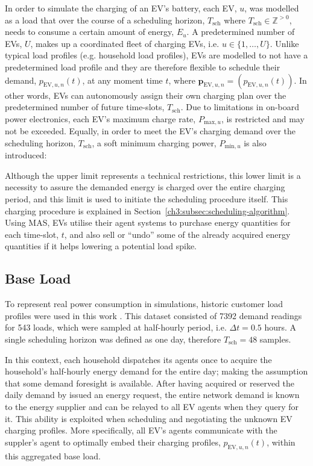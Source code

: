 In order to simulate the charging of an EV's battery, each EV, $u$, was modelled as a load that over the course of a scheduling horizon, $T_\text{sch}$ where $T_\text{sch} \in \mathbb{Z}^{>0}$, needs to consume a certain amount of energy, $E_u$.
A predetermined number of EVs, $U$, makes up a coordinated fleet of charging EVs, i.e. $u \in \{1, \dots, U\}$.
Unlike typical load profiles (e.g. household load profiles), EVs are modelled to not have a predetermined load profile and they are therefore flexible to schedule their demand, $p_{\text{EV},u,n}(t)$, at any moment time $t$, where $\textbf{p}_{\text{EV},u,n} = (p_{\text{EV},u,n}(t))$.
In other words, EVs can autonomously assign their own charging plan over the predetermined number of future time-slots, $T_\text{sch}$.
Due to limitations in on-board power electronics, each EV's maximum charge rate, $P_{\text{max},u}$, is restricted and may not be exceeded.
Equally, in order to meet the EV's charging demand over the scheduling horizon, $T_\text{sch}$, a soft minimum charging power, $P_{\text{min},u}$ is also introduced:



Although the upper limit represents a technical restrictions, this lower limit is a necessity to assure the demanded energy is charged over the entire charging period, and this limit is used to initiate the scheduling procedure itself.
This charging procedure is explained in Section~\ref{ch3:subsec:scheduling-algorithm}.
Using MAS, EVs utilise their agent systems to purchase energy quantities for each time-slot, $t$, and also sell or ``undo'' some of the already acquired energy quantities if it helps lowering a potential load spike.

\subsection{Base Load}


To represent real power consumption in simulations, historic customer load profiles were used in this work \cite{IrishData2002}.
This dataset consisted of 7392 demand readings for 543 loads, which were sampled at half-hourly period, i.e. $\Delta t = 0.5$ hours.
A single scheduling horizon was defined as one day, therefore $T_\text{sch}=48$ samples.

In this context, each household dispatches its agents once to acquire the household's half-hourly energy demand for the entire day; making the assumption that some demand foresight is available.
After having acquired or reserved the daily demand by issued an energy request, the entire network demand is known to the energy supplier and can be relayed to all EV agents when they query for it.
This ability is exploited when scheduling and negotiating the unknown EV charging profiles.
More specifically, all EV's agents communicate with the suppler's agent to optimally embed their charging profiles, $p_{\text{EV},u,n}(t)$, within this aggregated base load.

